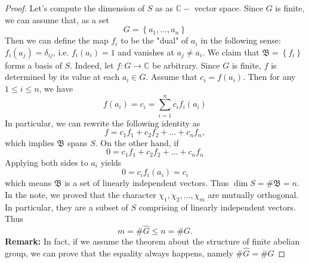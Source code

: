 \documentclass[11pt,letterpaper]{article}
\DeclareMathOperator{\1}{\mathbbm{1}}
\begin{document}
\begin{proof}
  Let's compute the dimension of $S$ as
  as $\mathbb{C}-$ vector space. Since $G$ is finite, we can assume that, as a set
  \[G = \left\lbrace a_1,\ldots,a_n \right\rbrace\]
  Then we can define the map $f_i$ to be the "dual" of $a_i$ in the following sense: $f_i(a_j) =\delta_{ij}$, i.e.
  $f_i(a_i)=1$ and vanishes at $a_j \ne a_i$. We claim that $\mathfrak{B}= \left\lbrace f_i \right\rbrace$ forms a basis of $S$.
  Indeed, let $f\colon G \to \mathbb{C}$ be arbitrary. Since $G$ is finite, $f$ is determined by its value at each $a_i \in G$.
  Assume that $c_i = f(a_i)$. Then for any $1 \le i \le n$, we have
  \[f(a_i) = c_i = \sum_{i=1}^n c_i f_i(a_i)\]
  In particular, we can rewrite the following identity as
  \[f = c_1f_1+c_2f_2+\ldots+c_nf_n,\]
  which implies $\mathfrak{B}$ spans $S$. On the other hand, if
  \[0 = c_1f_1+c_2f_2+\ldots+c_nf_n\]
  Applying both sides to $a_i$ yields
  \[0 = c_if_i(a_i) = c_i\]
  which means $\mathfrak{B}$ is a set of linearly independent vectors. Thus $\dim S = \#\mathfrak{B} = n$.
  In the note, we proved that the character $\chi_1,\chi_2,\ldots,\chi_m$ are mutually orthogonal. In particular, they are
  a subset of $S$ comprising of linearly independent vectors. Thus
  \[m = \#\hat{G} \le n = \# G. \]
  \textbf{Remark:} In fact, if we assume the theorem about the structure of finite abelian group, we can prove that
  the equality always happens, namely $ \#\hat{G} =\# G$
\end{proof}
\newpage
\end{document}
